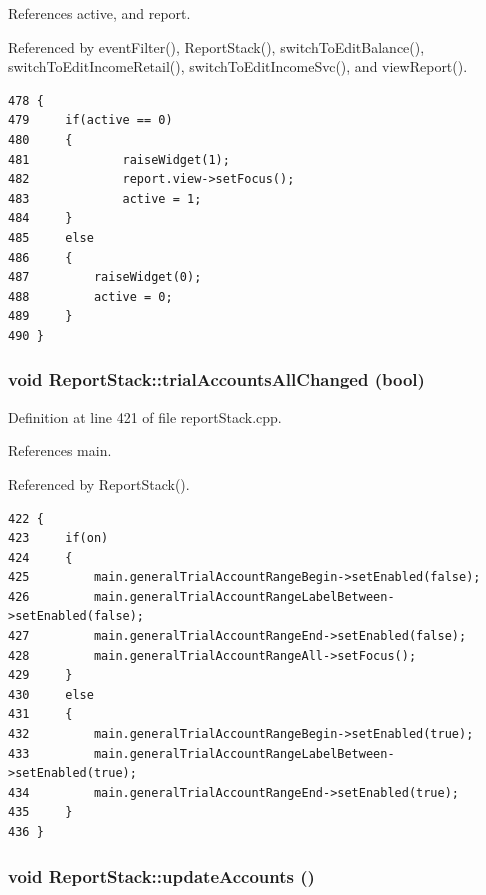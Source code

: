 References active, and report.

Referenced by event\-Filter(), Report\-Stack(), switch\-To\-Edit\-Balance(), switch\-To\-Edit\-Income\-Retail(), switch\-To\-Edit\-Income\-Svc(), and view\-Report().

\footnotesize\begin{verbatim}478 {
479     if(active == 0)
480     {
481             raiseWidget(1);
482             report.view->setFocus();
483             active = 1;
484     }
485     else
486     {
487         raiseWidget(0);
488         active = 0;
489     }
490 }
\end{verbatim}\normalsize 


\hypertarget{classReportStack_k1}{
\subsubsection[trialAccountsAllChanged]{\setlength{\rightskip}{0pt plus 5cm}void Report\-Stack::trial\-Accounts\-All\-Changed (bool)}}
\label{classReportStack_k1}


Definition at line 421 of file report\-Stack.cpp.

References main.

Referenced by Report\-Stack().

\footnotesize\begin{verbatim}422 {
423     if(on)
424     {
425         main.generalTrialAccountRangeBegin->setEnabled(false);
426         main.generalTrialAccountRangeLabelBetween->setEnabled(false);
427         main.generalTrialAccountRangeEnd->setEnabled(false);
428         main.generalTrialAccountRangeAll->setFocus();
429     }
430     else
431     {
432         main.generalTrialAccountRangeBegin->setEnabled(true);
433         main.generalTrialAccountRangeLabelBetween->setEnabled(true);
434         main.generalTrialAccountRangeEnd->setEnabled(true);
435     }
436 }
\end{verbatim}\normalsize 


\hypertarget{classReportStack_k3}{
\subsubsection[updateAccounts]{\setlength{\rightskip}{0pt plus 5cm}void Report\-Stack::update\-Accounts ()}}
\label{classReportStack_k3}


